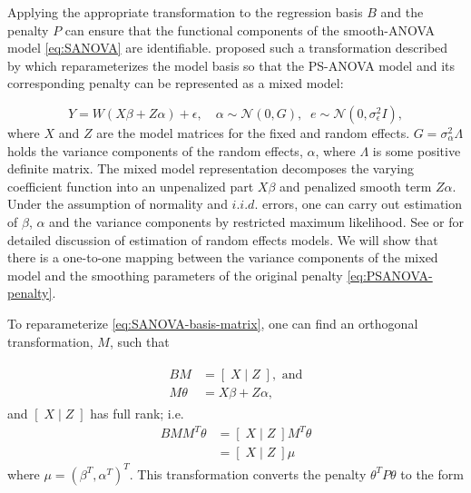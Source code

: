 \documentclass[12pt]{article}
\theoremstyle{definition}
\begin{document}
Applying the appropriate transformation to the regression basis $B$ and the penalty $P$ can ensure that the functional components of the smooth-ANOVA model \ref{eq:SANOVA} are identifiable. \citet{lee2011p} proposed such a transformation described by \citet{currie2002flexible} which reparameterizes the model basis so that the PS-ANOVA model and its corresponding penalty can be represented as a mixed model:

\begin{equation}  \label{eq:vc-mixed-effects-model}
Y = W\left(X \beta + Z \alpha\right) + \epsilon, \quad \alpha \sim \mathcal{N}\left(0,G \right),\;\;e\sim\mathcal{N}\left(0,\sigma^2_\epsilon I \right),
\end{equation} 
\noindent
where $X$ and $Z$ are the model matrices for the fixed and random effects. $G = \sigma_\alpha^2 \Lambda$ holds the variance components of the random effects, $\alpha$, where $\Lambda$ is some positive definite matrix. The mixed model representation decomposes the varying coefficient function into an unpenalized part $X \beta$ and penalized smooth term $Z \alpha.$ Under the assumption of normality and $i.i.d.$ errors, one can carry out estimation of $\beta$, $\alpha$ and the variance components by restricted maximum likelihood. See \citet{schall1991estimation} or  \citet{patterson1971recovery} for detailed discussion of estimation of random effects models.  We will show that there is a one-to-one mapping between the variance components of the mixed model and the smoothing parameters of the original penalty \ref{eq:PSANOVA-penalty}. 

To reparameterize \ref{eq:SANOVA-basis-matrix}, one can find an orthogonal transformation, $M$, such that

\begin{align}
\begin{split} \label{eq:PSANOVA-to-mm-mapping}
BM &= \left[\; X \; \vert \; Z \; \right], \mbox{ and}\\
M \theta &= X \beta + Z \alpha,
\end{split}
\end{align}
\noindent
and $\left[\; X \; \vert \; Z \; \right]$ has full rank; i.e.
\begin{align*}
B M M^T \theta &= \left[\; X \; \vert \; Z \; \right]M^T \theta \\
&= \left[\; X \; \vert \; Z \; \right] \mu
\end{align*}
\noindent
where $\mu = \left(\beta^T,\alpha^T\right)^T$. This transformation converts the penalty $\theta^T P \theta$ to the form
\end{document}
